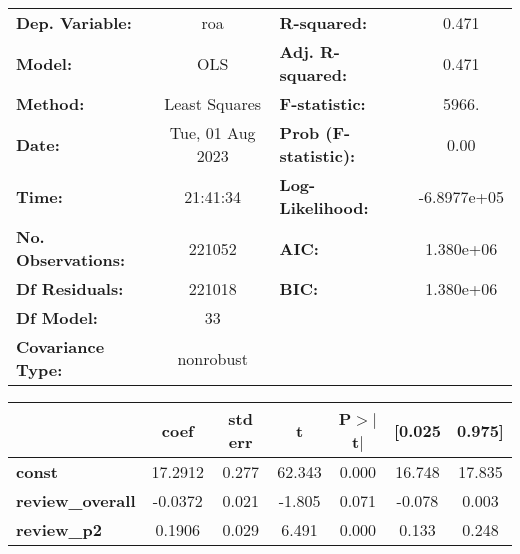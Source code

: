 \begin{center}
\begin{tabular}{lclc}
\toprule
\textbf{Dep. Variable:}                                               &       roa        & \textbf{  R-squared:         } &      0.471   \\
\textbf{Model:}                                                       &       OLS        & \textbf{  Adj. R-squared:    } &      0.471   \\
\textbf{Method:}                                                      &  Least Squares   & \textbf{  F-statistic:       } &      5966.   \\
\textbf{Date:}                                                        & Tue, 01 Aug 2023 & \textbf{  Prob (F-statistic):} &      0.00    \\
\textbf{Time:}                                                        &     21:41:34     & \textbf{  Log-Likelihood:    } & -6.8977e+05  \\
\textbf{No. Observations:}                                            &      221052      & \textbf{  AIC:               } &  1.380e+06   \\
\textbf{Df Residuals:}                                                &      221018      & \textbf{  BIC:               } &  1.380e+06   \\
\textbf{Df Model:}                                                    &          33      & \textbf{                     } &              \\
\textbf{Covariance Type:}                                             &    nonrobust     & \textbf{                     } &              \\
\bottomrule
\end{tabular}
\begin{tabular}{lcccccc}
                                                                      & \textbf{coef} & \textbf{std err} & \textbf{t} & \textbf{P$> |$t$|$} & \textbf{[0.025} & \textbf{0.975]}  \\
\midrule
\textbf{const}                                                        &      17.2912  &        0.277     &    62.343  &         0.000        &       16.748    &       17.835     \\
\textbf{review\_overall}                                              &      -0.0372  &        0.021     &    -1.805  &         0.071        &       -0.078    &        0.003     \\
\textbf{review\_p2}                                                   &       0.1906  &        0.029     &     6.491  &         0.000        &        0.133    &        0.248     \\

\end{tabular}
\end{center}
